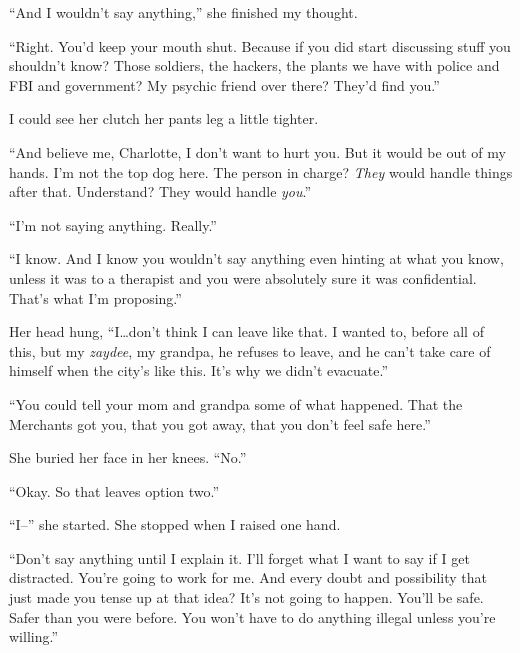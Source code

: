 ``And I wouldn't say anything,'' she finished my thought.



``Right.  You'd keep your mouth shut.  Because if you did start discussing stuff you shouldn't know?  Those soldiers, the hackers, the plants we have with police and FBI and government?  My psychic friend over there?  They'd find you.''



I could see her clutch her pants leg a little tighter.



``And believe me, Charlotte, I don't want to hurt you.  But it would be out of my hands.  I'm not the top dog here.  The person in charge?  \emph{They} would handle things after that.  Understand?  They would handle \emph{you}.''



``I'm not saying anything.  Really.''



``I know.  And I know you wouldn't say anything even hinting at what you know, unless it was to a therapist and you were absolutely sure it was confidential.  That's what I'm proposing.''



Her head hung, ``I\ldots don't think I can leave like that.  I wanted to, before all of this, but my \emph{zaydee}, my grandpa, he refuses to leave, and he can't take care of himself when the city's like this.  It's why we didn't evacuate.''



``You could tell your mom and grandpa some of what happened.  That the Merchants got you, that you got away, that you don't feel safe here.''



She buried her face in her knees.  ``No.''



``Okay.  So that leaves option two.''



``I--'' she started.  She stopped when I raised one hand.



``Don't say anything until I explain it.  I'll forget what I want to say if I get distracted.  You're going to work for me.  And every doubt and possibility that just made you tense up at that idea?  It's not going to happen.  You'll be safe.  Safer than you were before.  You won't have to do anything illegal unless you're willing.''




